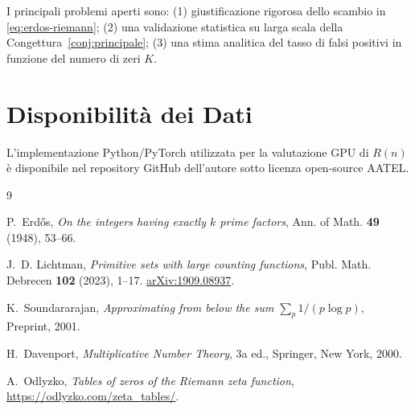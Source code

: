 \documentclass[11pt,a4paper]{article}
\begin{document}
I principali problemi aperti sono: (1) giustificazione rigorosa dello scambio in
\eqref{eq:erdos-riemann}; (2) una validazione statistica su larga scala della
Congettura~\ref{conj:principale}; (3) una stima analitica del tasso di falsi
positivi in funzione del numero di zeri $K$.

\section*{Disponibilit\`a dei Dati}

L'implementazione Python/PyTorch utilizzata per la valutazione GPU di $R(n)$ \`e
disponibile nel repository GitHub dell'autore sotto licenza open-source AATEL.

\begin{thebibliography}{9}

P.~Erd\H{o}s,
\textit{On the integers having exactly $k$ prime factors},
Ann. of Math. \textbf{49} (1948), 53--66.

J.~D. Lichtman,
\textit{Primitive sets with large counting functions},
Publ. Math. Debrecen \textbf{102} (2023), 1--17.
\href{https://arxiv.org/abs/1909.08937}{arXiv:1909.08937}.

K.~Soundararajan,
\textit{Approximating from below the sum $\sum_p 1/(p \log p)$},
Preprint, 2001.

H.~Davenport,
\textit{Multiplicative Number Theory}, 3a ed.,
Springer, New York, 2000.

A.~Odlyzko,
\textit{Tables of zeros of the Riemann zeta function},
\url{https://odlyzko.com/zeta\_tables/}.

\end{thebibliography}
\end{document}
